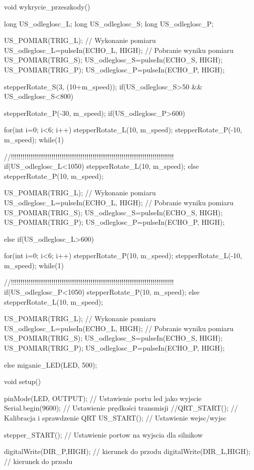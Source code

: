 void wykrycie_przeszkody(){
  long US_odleglosc_L;
  long US_odleglosc_S;
  long US_odleglosc_P;

  US_POMIAR(TRIG_L);                    // Wykonanie pomiaru
  US_odleglosc_L=pulseIn(ECHO_L, HIGH); // Pobranie wyniku pomiaru
  US_POMIAR(TRIG_S);
  US_odleglosc_S=pulseIn(ECHO_S, HIGH);
  US_POMIAR(TRIG_P);
  US_odleglosc_P=pulseIn(ECHO_P, HIGH);

  stepperRotate_S(3, (10+m_speed));
  if(US_odleglosc_S>50 && US_odleglosc_S<800){
    stepperRotate_P(-30, m_speed);
      if(US_odleglosc_P>600){
        for(int i=0; i<6; i++) {
          stepperRotate_L(10, m_speed);
          stepperRotate_P(-10, m_speed);
        }
        while(1){ //!!!!!!!!!!!!!!!!!!!!!!!!!!!!!!!!!!!!!!!!!!!!!!!!!!!!!!!!!!!!!!!!!!!!!!!!!!!!!!!!!!!!
          if(US_odleglosc_L<1050) {
            stepperRotate_L(10, m_speed);
          }
          else stepperRotate_P(10, m_speed);
          
          US_POMIAR(TRIG_L);                    // Wykonanie pomiaru
          US_odleglosc_L=pulseIn(ECHO_L, HIGH); // Pobranie wyniku pomiaru
          US_POMIAR(TRIG_S);
          US_odleglosc_S=pulseIn(ECHO_S, HIGH);
          US_POMIAR(TRIG_P);
          US_odleglosc_P=pulseIn(ECHO_P, HIGH);
        }
      }
      else if(US_odleglosc_L>600){
        for(int i=0; i<6; i++) {
          stepperRotate_P(10, m_speed);
          stepperRotate_L(-10, m_speed);
        }
        while(1){ //!!!!!!!!!!!!!!!!!!!!!!!!!!!!!!!!!!!!!!!!!!!!!!!!!!!!!!!!!!!!!!!!!!!!!!!!!!!!!!!!!!!!
          if(US_odleglosc_P<1050) {
            stepperRotate_P(10, m_speed);
          }
          else stepperRotate_L(10, m_speed);
                  
          US_POMIAR(TRIG_L);                    // Wykonanie pomiaru
          US_odleglosc_L=pulseIn(ECHO_L, HIGH); // Pobranie wyniku pomiaru
          US_POMIAR(TRIG_S);
          US_odleglosc_S=pulseIn(ECHO_S, HIGH);
          US_POMIAR(TRIG_P);
          US_odleglosc_P=pulseIn(ECHO_P, HIGH);
        }
      }
      else miganie_LED(LED, 500);
  }
}

void setup() {
  pinMode(LED, OUTPUT); // Ustawienie portu led jako wyjscie
  Serial.begin(9600);   // Ustawienie prędkości transmisji
  //QRT_START();          // Kalibracja i sprawdzenie QRT
  US_START();           // Ustawienie wejsc/wyjsc

  stepper_START();      // Ustawienie portow na wyjscia dla silnikow
  
  digitalWrite(DIR_P,HIGH); // kierunek do przodu
  digitalWrite(DIR_L,HIGH); // kierunek do przodu
}

